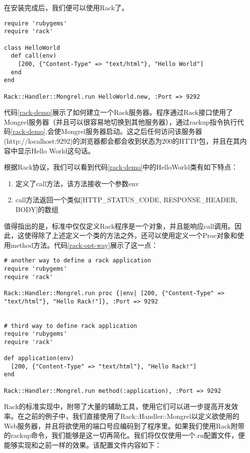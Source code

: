 在安装完成后，我们便可以使用Rack了。

\begin{lstlisting}[caption={一个简单的Rack服务器}, label=rack-demo]
require 'rubygems'
require 'rack'

class HelloWorld
  def call(env)
    [200, {"Content-Type" => "text/html"}, "Hello World"]
  end
end

Rack::Handler::Mongrel.run HelloWorld.new, :Port => 9292
\end{lstlisting}

代码\ref{rack-demo}展示了如何建立一个Rack服务器。程序通过Rack接口使用了Mongrel服务器（并且可以很容易地切换到其他服务器），通过rackup指令执行代码\ref{rack-demo},会使Mongrel服务器启动。这之后任何访问该服务器(http://localhost:9292)的浏览器都会都会收到状态为200的HTTP包，并且在其内容中显示Hello World这句话。

根据Rack协议，我们可以看到代码\ref{rack-demo}中的HelloWorld类有如下特点：

\begin{enumerate}
\item 定义了call方法，该方法接收一个参数env
\item call方法返回一个类似[HTTP\_STATUS\_CODE, RESPONSE\_HEADER, BODY]的数组
\end{enumerate}

值得指出的是，标准中仅仅定义Rack程序是一个对象，并且能响应call调用。因此，这使得除了上述定义一个类的方法之外，还可以使用定义一个Proc对象和使用method方法。代码\ref{rack-opt-way}展示了这一点：

\begin{lstlisting}[caption={Rack程序的其他实现}, label=rack-opt-way]
# another way to define a rack application
require 'rubygems'
require 'rack'

Rack::Handler::Mongrel.run proc {|env| [200, {"Content-Type" => "text/html"}, "Hello Rack!"]}, :Port => 9292


# third way to define rack application
require 'rubygems'
require 'rack'

def application(env)
  [200, {"Content-Type" => "text/html"}, "Hello Rack!"]
end

Rack::Handler::Mongrel.run method(:application), :Port => 9292
\end{lstlisting}

Rack的标准实现中，附带了大量的辅助工具，使用它们可以进一步提高开发效率。在之前的例子中，我们直接使用了Rack::Handler::Mongrel以定义欲使用的Web服务器，并且将欲使用的端口号应编码到了程序里。如果我们使用Rack附带的rackup命令，我们能够是这一切再简化。我们将仅仅使用一个.ru配置文件，便能够实现和之前一样的效果。该配置文件内容如下：

